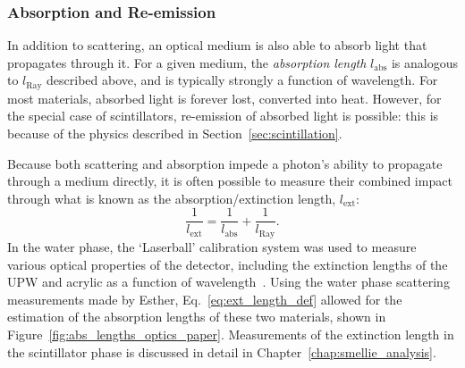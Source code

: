 
\subsubsection{Absorption and Re-emission}
In addition to scattering, an optical medium is also able to absorb light that propagates through it. For a given medium, the \textit{absorption length} $l_{\mathrm{abs}}$ is analogous to $l_{\mathrm{Ray}}$ described above, and is typically strongly a function of wavelength. For most materials, absorbed light is forever lost, converted into heat. However, for the special case of scintillators, re-emission of absorbed light is possible: this is because of the physics described in Section~\ref{sec:scintillation}.

Because both scattering and absorption impede a photon's ability to propagate through a medium directly, it is often possible to measure their combined impact through what is known as the absorption/extinction length, $l_{\mathrm{ext}}$:
\begin{equation}\label{eq:ext_length_def}
    \frac{1}{l_{\mathrm{ext}}} = \frac{1}{l_{\mathrm{abs}}} + \frac{1}{l_{\mathrm{Ray}}}.
\end{equation}
In the water phase, the `Laserball' calibration system was used to measure various optical properties of the detector, including the extinction lengths of the UPW and acrylic as a function of wavelength~\cite{andersonOpticalCalibrationSNO2021}. Using the water phase scattering measurements made by Esther, Eq.~\ref{eq:ext_length_def} allowed for the estimation of the absorption lengths of these two materials, shown in Figure~\ref{fig:abs_lengths_optics_paper}. Measurements of the extinction length in the scintillator phase is discussed in detail in Chapter~\ref{chap:smellie_analysis}.

